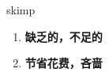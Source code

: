 
\begin{frame}
{\huge skimp}
\begin{center}
\begin{enumerate}\Large
  \item \textbf{缺乏的，不足的}
  \item \textbf{节省花费，吝啬}
\end{enumerate}
\end{center}
\end{frame}
